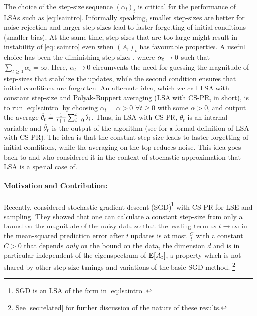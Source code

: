 The choice of the step-size sequence $(\alpha_t)_t$ is critical for the performance of LSAs such as \eqref{eq:lsaintro}.
Informally speaking, smaller step-sizes are better for noise rejection and larger step-sizes lead to faster forgetting of initial conditions (smaller bias). At the same time, step-sizes that are too large might result in instability of \eqref{eq:lsaintro} even when $(A_t)_t$ has favourable properties. 
A useful choice has been the diminishing step-sizes \cite{gtd2,gtdmp,konda-tsitsiklis}, where $\alpha_t\rightarrow 0$ such that $\sum_{t\geq 0} \alpha_t=\infty$. Here, $\alpha_t\to0$ circumvents the need for guessing the magnitude of step-sizes that stabilize the updates, while the second condition ensures that initial conditions are forgotten. 
An alternate idea, which we call LSA with constant step-size and Polyak-Ruppert averaging (LSA with CS-PR, in short), is to run \eqref{eq:lsaintro} by choosing $\alpha_t=\alpha>0$ $\forall t\geq 0$ with some $\alpha>0$, and output the average $\hat{\theta}_t\stackrel{\cdot}{=}\frac{1}{t+1}\sum_{i=0}^t \theta_i$. Thus, in LSA with CS-PR, $\theta_t$ is an internal variable and $\hat{\theta}_t$ is the output of the algorithm (see  for a formal definition of LSA with CS-PR). The idea is that the constant step-size leads to faster forgetting of initial conditions, while the averaging on the top
reduces noise.
This idea goes back to  \citet{ruppert} and \citet{polyak-judisky} who considered it in the context of stochastic approximation that LSA is a special case of. 
\paragraph{Motivation and Contribution:} Recently, \citet{bach} considered stochastic gradient descent (SGD)\footnote{SGD is an LSA of the form in \eqref{eq:lsaintro}.} with CS-PR for LSE and \iid sampling. They showed that one can calculate a constant step-size from only a bound on the magnitude of the noisy data so that the leading term as $t\to\infty$
 in the mean-squared prediction error after $t$ updates is at most $\frac{C}{t}$ with a constant $C>0$ that depends \emph{only} on the bound on the data, the dimension $d$ and is in particular independent of the eigenspectrum of $\mathbf{E}[A_t]$, a property which is not shared by other step-size tunings and variations of the basic SGD method.%
 \footnote{See \cref{sec:related} for further discussion of the nature of these results.}

